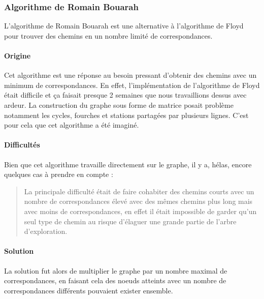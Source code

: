\documentclass[french, 12pt]{article}
\begin{document}
\subsubsection{Algorithme de Romain Bouarah}
L'algorithme de Romain Bouarah est une alternative à l'algorithme de Floyd pour trouver des chemins en un nombre limité de correspondances.

\paragraph{Origine}
Cet algorithme est une réponse au besoin pressant d'obtenir des chemins avec un minimum de correspondances.
En effet, l'implémentation de l'algorithme de Floyd était difficile et ça faisait presque 2 semaines que nous travaillions dessus avec ardeur.
La construction du graphe sous forme de matrice posait problème notamment les cycles, fourches et stations partagées par plusieurs lignes.
C'est pour cela que cet algorithme a été imaginé.

\paragraph{Difficultés}
Bien que cet algorithme travaille directement sur le graphe, il y a, hélas, encore quelques cas à prendre en compte :

\begin{quote}  
  La principale difficulté était de faire cohabiter des chemins courts avec un nombre de correspondances élevé avec des mêmes chemins plus long mais avec moins de correspondances, en effet il était impossible de garder qu'un seul type de chemin au risque d'élaguer une grande partie de l'arbre d'exploration.
\end{quote}

\paragraph{Solution}
La solution fut alors de multiplier le graphe par un nombre maximal de correspondances, en faisant cela des noeuds atteints avec un nombre de correspondances différents pouvaient exister ensemble.


\newpage
\end{document}

